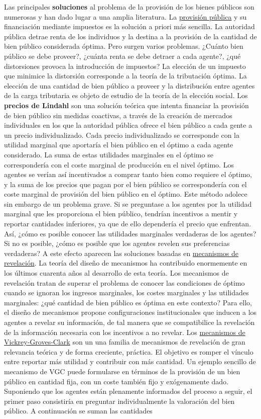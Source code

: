 \documentclass{nuevotema}
\begin{document}
Las principales \textbf{soluciones} al problema de la provisión de los bienes públicos son numerosas y han dado lugar a una amplia literatura. La \underline{provisión pública} y su financiación mediante impuestos es la solución a priori más sencilla. La autoridad pública detrae renta de los individuos y la destina a la provisión de la cantidad de bien público considerada óptima. Pero surgen varios problemas. ¿Cuánto bien público se debe proveer?, ¿cuánta renta se debe detraer a cada agente?, ¿qué distorsiones provoca la introducción de impuestos? La elección de un impuesto que minimice la distorsión corresponde a la teoría de la tributación óptima. La elección de una cantidad de bien público a proveer y la distribución entre agentes de la carga tributaria es objeto de estudio de la teoría de la elección social. Los \textbf{precios de Lindahl} son una solución teórica que intenta financiar la provisión de bien público sin medidas coactivas, a través de la creación de mercados individuales en los que la autoridad pública ofrece el bien público a cada gente a un precio individualizado. Cada precio individualizado se corresponde con la utilidad marginal que aportaría el bien público en el óptimo a cada agente considerado. La suma de estas utilidades marginales en el óptimo se correspondería con el coste marginal de producción en el nivel óptimo. Los agentes se verían así incentivados a comprar tanto bien como requiere el óptimo, y la suma de los precios que pagan por el bien público se correspondería con el coste marginal de provisión del bien público en el óptimo. Este método adolece sin embargo de un problema grave. Si se preguntase a los agentes por la utilidad marginal que les proporciona el bien público, tendrían incentivos a mentir y reportar cantidades inferiores, ya que de ello dependería el precio que enfrentan. Así, ¿cómo es posible conocer las utilidades marginales verdaderas de los agentes? Si no es posible, ¿cómo es posible que los agentes revelen sus preferencias verdaderas? A este efecto aparecen las soluciones basadas en \underline{mecanismos de revelación}. La teoría del diseño de mecanismos ha contribuido enormemente en los últimos cuarenta años al desarrollo de esta teoría. Los mecanismos de revelación tratan de superar el problema de conocer las condiciones de óptimo cuando se ignoran los ingresos marginales, los costes marginales y las utilidades marginales: ¿qué cantidad de bien público es óptima en este contexto? Para ello, el diseño de mecanismos propone configuraciones institucionales que inducen a los agentes a revelar su información, de tal manera que se compatibilice la revelación de la información necesaria con los incentivos a no revelar. Los \underline{mecanismos de Vickrey-Groves-Clark} son un una familia de mecanismos de revelación de gran relevancia teórica y de forma creciente, práctica. El objetivo es romper el vínculo entre reportar más utilidad y contribuir con más cantidad. Un ejemplo sencillo de mecanismo de VGC puede formularse en términos de la provisión de un bien público en cantidad fija, con un coste también fijo y exógenamente dado. Suponiendo que los agentes están plenamente informados del proceso a seguir, el primer paso consistiría en preguntar individualmente la valoración del bien público. A continuación se suman las cantidades 
\end{document}
